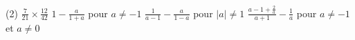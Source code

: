 %
%
	\begin{tasks}(2)
		\task $\frac{7}{21}\times\frac{12}{42}$
		\task $1-\frac{a}{1+a}$ pour $a\neq- 1$
		\task $\frac{1}{a-1}-\frac{a}{1-a}$ pour $\mid a\mid \neq 1$
		\task $\frac{a-1+\frac{2}{a}}{a+1} -\frac{1}{a}$ pour $a\neq -1$ et $a\neq 0$
	\end{tasks}
